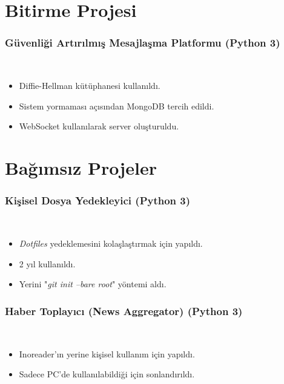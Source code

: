\documentclass[a4paper, 9pt]{extarticle}
\begin{document}
\makebaslik{}
\myegitim{}
\mydeneyim{}

\section{Bitirme Projesi}
\subsubsection{Güvenliği Artırılmış Mesajlaşma Platformu (Python 3)} \hfill \\
\vspace{-1.9em} \begin{itemize}
    \itemsep-0.7em
    \item Diffie-Hellman kütüphanesi kullanıldı.
    \item Sistem yormaması açısından MongoDB tercih edildi.
    \item WebSocket kullanılarak server oluşturuldu.
\end{itemize}

\section{Bağımsız Projeler}
\subsubsection{Kişisel Dosya Yedekleyici (Python 3)} \hfill \\
\vspace{-1.9em}\begin{itemize}
    \itemsep-0.7em
    \item \emph{Dotfiles} yedeklemesini kolaşlaştırmak için yapıldı.
    \item 2 yıl kullanıldı.
    \item Yerini "\emph{git init --bare root}" yöntemi aldı.
\end{itemize}

\subsubsection{Haber Toplayıcı (News Aggregator) (Python 3)} \hfill \\
\vspace{-1.9em} \begin{itemize}
    \itemsep-0.7em
    \item Inoreader'ın yerine kişisel kullanım için yapıldı.
    \item Sadece PC'de kullanılabildiği için sonlandırıldı.
\end{itemize}
\end{document}
